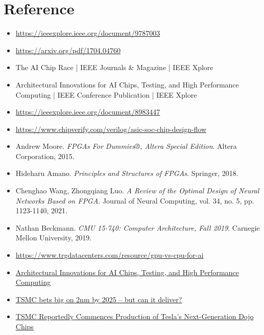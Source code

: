 \documentclass[a4paper]{article}
\begin{document}
\section{Reference}
\begin{itemize}
    \item \href{https://ieeexplore.ieee.org/document/9787003}{https://ieeexplore.ieee.org/document/9787003}
    \item \href{https://arxiv.org/pdf/1704.04760 }{https://arxiv.org/pdf/1704.04760 }
    \item The AI Chip Race | IEEE Journals \& Magazine | IEEE Xplore
    \item Architectural Innovations for AI Chips, Testing, and High Performance Computing | IEEE Conference Publication | IEEE Xplore
    \item \href{https://ieeexplore.ieee.org/document/8983447}{https://ieeexplore.ieee.org/document/8983447}
    \item \href{https://www.chipverify.com/verilog/asic-soc-chip-design-flow#what-is-vlsi}{https://www.chipverify.com/verilog/asic-soc-chip-design-flow}
    \item Andrew Moore. \textit{FPGAs For Dummies®, Altera Special Edition}. Altera Corporation, 2015.
    \item Hideharu Amano. \textit{Principles and Structures of FPGAs}. Springer, 2018.
    \item Chenghao Wang, Zhongqiang Luo. \textit{A Review of the Optimal Design of Neural Networks Based on FPGA}. Journal of Neural Computing, vol. 34, no. 5, pp. 1123-1140, 2021.
    \item Nathan Beckmann. \textit{CMU 15-740: Computer Architecture, Fall 2019}. Carnegie Mellon University, 2019.
    \item \href{https://www.trgdatacenters.com/resource/gpu-vs-cpu-for-ai/#gpu_vs_cpu_key_differences}{https://www.trgdatacenters.com/resource/gpu-vs-cpu-for-ai}
    \item \href{https://www.researchgate.net/publication/388910291_Architectural_Innovations_for_AI_Chips_Testing_and_High_Performance_Computing}{Architectural Innovations for AI Chips, Testing, and High Performance Computing}
    \item \href{https://www.theregister.com/2024/11/29/tsmc_2nm_mass_production/}{TSMC bets big on 2nm by 2025 – but can it deliver?}
    \item \href{https://www.trendforce.com/news/2024/05/03/news-tsmc-reportedly-commences-production-of-teslas-next-generation-dojo-chips-anticipates-40x-increase-in-computing-power-in-3-years/}{TSMC Reportedly Commences Production of Tesla’s Next-Generation Dojo Chips}

\end{itemize}
\end{document}
